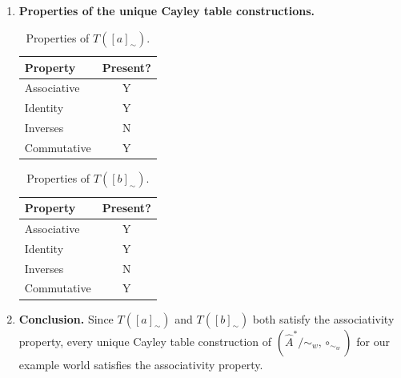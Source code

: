 \begin{proofE}
\begin{enumerate}
    \item \textbf{Properties of the unique Cayley table constructions.}
    \begin{table}[H]
        \centering
        \begin{tabular}{l|c}
        \textbf{Property} & \textbf{Present?} \\
        \hline
        Associative & Y \\
        Identity & Y \\
        Inverses & N \\
        \hline
        Commutative & Y \\
        \end{tabular}
        \caption{
        Properties of $T([a]_{\sim})$.
        }
    \end{table}
    
    \begin{table}[H]
        \centering
        \begin{tabular}{l|c}
        \textbf{Property} & \textbf{Present?} \\
        \hline
        Associative & Y \\
        Identity & Y \\
        Inverses & N \\
        \hline
        Commutative & Y \\
        \end{tabular}
        \caption{
        Properties of $T([b]_{\sim})$.
        }
    \end{table}

    \item \textbf{Conclusion.}
    Since $T([a]_{\sim})$ and $T([b]_{\sim})$ both satisfy the associativity property, every unique Cayley table construction of $(\hat{A}^{*}/\sim_{w}, \circ_{\sim_{w}})$ for our example world satisfies the associativity property.
\end{enumerate}
\end{proofE}


